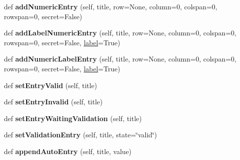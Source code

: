 \begin{DoxyCompactItemize}
\item 
\mbox{\label{class_python_01_g_u_i_1_1appjar_1_1gui_a02f3619dc930d8b7da4cdad66b902bd6}} 
def {\bfseries add\+Numeric\+Entry} (self, title, row=None, column=0, colspan=0, rowspan=0, secret=False)
\item 
\mbox{\label{class_python_01_g_u_i_1_1appjar_1_1gui_aa190d4fa4bf4ea6afb451d588126ab57}} 
def {\bfseries add\+Label\+Numeric\+Entry} (self, title, row=None, column=0, colspan=0, rowspan=0, secret=False, \hyperlink{class_python_01_g_u_i_1_1appjar_1_1gui_a899e593dca96dd2a31035558b685e3bd}{label}=True)
\item 
\mbox{\label{class_python_01_g_u_i_1_1appjar_1_1gui_abd56e540b4e0c505d0c8f332c0e60ef5}} 
def {\bfseries add\+Numeric\+Label\+Entry} (self, title, row=None, column=0, colspan=0, rowspan=0, secret=False, \hyperlink{class_python_01_g_u_i_1_1appjar_1_1gui_a899e593dca96dd2a31035558b685e3bd}{label}=True)
\item 
\mbox{\label{class_python_01_g_u_i_1_1appjar_1_1gui_ae7734440646560c54eca8f1bd5ec4e0f}} 
def {\bfseries set\+Entry\+Valid} (self, title)
\item 
\mbox{\label{class_python_01_g_u_i_1_1appjar_1_1gui_a6d1720b56cfadb4d0c5bfb29b0609feb}} 
def {\bfseries set\+Entry\+Invalid} (self, title)
\item 
\mbox{\label{class_python_01_g_u_i_1_1appjar_1_1gui_a49fe1fd17f8555e22772985a45f6c3d2}} 
def {\bfseries set\+Entry\+Waiting\+Validation} (self, title)
\item 
\mbox{\label{class_python_01_g_u_i_1_1appjar_1_1gui_aa2c423bd59433fea1270d2dcabc8b1f9}} 
def {\bfseries set\+Validation\+Entry} (self, title, state=\char`\"{}valid\char`\"{})
\item 
\mbox{\label{class_python_01_g_u_i_1_1appjar_1_1gui_a8e1a76bbc9478e5fee3bc9a844f42e40}} 
def {\bfseries append\+Auto\+Entry} (self, title, value)

\end{DoxyCompactItemize}
